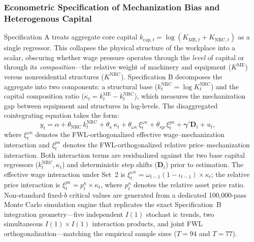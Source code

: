 \subsubsection{Econometric Specification of Mechanization Bias and Heterogenous Capital}
Specification A treats aggregate core capital $k_{\text{cap},t} = \log(K_{\text{ME},t} + K_{\text{NRC},t})$ as a single regressor. This collapses the physical structure of the workplace into a scalar, obscuring whether wage pressure operates through the \emph{level} of capital or through its \emph{composition}---the relative weight of machinery and equipment ($K^{\text{ME}}$) versus nonresidential structures ($K^{\text{NRC}}$). Specification B decomposes the aggregate into two components: a structural base ($k^{\text{NRC}}_t = \log K^{\text{NRC}}_t$) and the capital composition ratio ($\kappa_t = k^{\text{ME}}_t - k^{\text{NRC}}_t$), which measures the mechanization gap between equipment and structures in log-levels. The disaggregated cointegrating equation takes the form:
\begin{equation}
	y_t = \alpha + \theta_{\text{NRC}}\, k^{\text{NRC}}_t + \theta_\kappa\, \kappa_t + \theta_{\omega\kappa}\, \xi^{\omega\kappa}_t + \theta_{\kappa p}\, \xi^{p\kappa}_t + \boldsymbol{\gamma}' \mathbf{D}_t + u_t,
	\label{eq:432:specB_model}
\end{equation}
where $\xi^{\omega\kappa}_t$ denotes the FWL-orthogonalized effective wage--mechanization interaction and $\xi^{p\kappa}_t$ denotes the FWL-orthogonalized relative price--mechanization interaction. Both interaction terms are residualized against the two base capital regressors ($k^{\text{NRC}}_t, \kappa_t$) and deterministic step shifts ($\mathbf{D}_t$) prior to estimation. The effective wage interaction under Set~2 is $\xi^{\omega\kappa}_t = \omega_{t-1}(1-\iota_{t-1}) \times \kappa_t$; the relative price interaction is $\xi^{p\kappa}_t = p^{\kappa}_t \times \kappa_t$, where $p^{\kappa}_t$ denotes the relative asset price ratio. Non-standard fixed-$b$ critical values are generated from a dedicated 100,000-pass Monte Carlo simulation engine that replicates the exact Specification~B integration geometry---five independent $I(1)$ stochast
ic trends, two simultaneous $I(1) \times I(1)$ interaction products, and joint FWL orthogonalization---matching the empirical sample sizes ($T = 94$ and $T = 77$).

